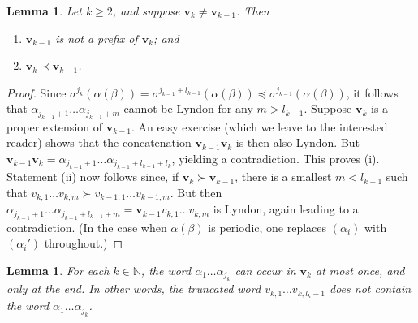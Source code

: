 \documentclass[11pt]{amsart}
\newtheorem{lemma}[theorem]{Lemma}
\theoremstyle{definition}
\theoremstyle{remark}
\numberwithin{equation}{section}
\newcommand{\N}{\ensuremath{\mathbb{N}}}
\renewcommand{\v}{\mathbf{v}}
\newcommand{\f}{\infty}
\newcommand{\al}{\alpha}
\newcommand{\lle}{\preccurlyeq}
\newcommand{\si}{\sigma}
\begin{document}
\begin{lemma} \label{lem:v_k-decreasing}
Let $k\geq 2$, and suppose $\v_{k}\neq \v_{k-1}$. Then
\begin{enumerate}[{\rm(i)}]
\item $\v_{k-1}$ is not a prefix of $\v_{k}$; and
\item $\v_k \prec \v_{k-1}$.
\end{enumerate}
\end{lemma}

\begin{proof}
Since $\si^{j_k}(\al(\beta))=\si^{j_{k-1}+l_{k-1}}(\al(\beta))\lle \si^{j_{k-1}}(\al(\beta))$, it follows that $\al_{j_{k-1}+1}\dots\al_{j_{k-1}+m}$ cannot be Lyndon for any $m>l_{k-1}$. Suppose $\v_k$ is a proper extension of $\v_{k-1}$. An easy exercise (which we leave to the interested reader) shows that the concatenation $\v_{k-1}\v_k$ is then also Lyndon. But $\v_{k-1}\v_k=\al_{j_{k-1}+1}\dots\al_{j_{k-1}+l_{k-1}+l_k}$, yielding a contradiction. This proves (i). Statement (ii) now follows since, if $\v_k\succ \v_{k-1}$, there is a smallest $m<l_{k-1}$ such that $v_{k,1}\dots v_{k,m}\succ v_{k-1,1}\dots v_{k-1,m}$. But then $\al_{j_{k-1}+1}\dots\al_{j_{k-1}+l_{k-1}+m}=\v_{k-1}v_{k,1}\dots v_{k,m}$ is Lyndon, again leading to a contradiction. (In the case when $\al(\beta)$ is periodic, one replaces $(\al_i)$ with $(\al_i')$ throughout.)
\end{proof}


\begin{lemma} \label{lem:header-suffix}
For each $k\in\N$, the word $\al_1\dots\al_{j_k}$ can occur in $\v_k$ at most once, and only at the end. In other words, the truncated word $v_{k,1}\dots v_{k,l_k-1}$ does not contain the word $\al_1\dots\al_{j_k}$.
\end{lemma}
\end{document}
